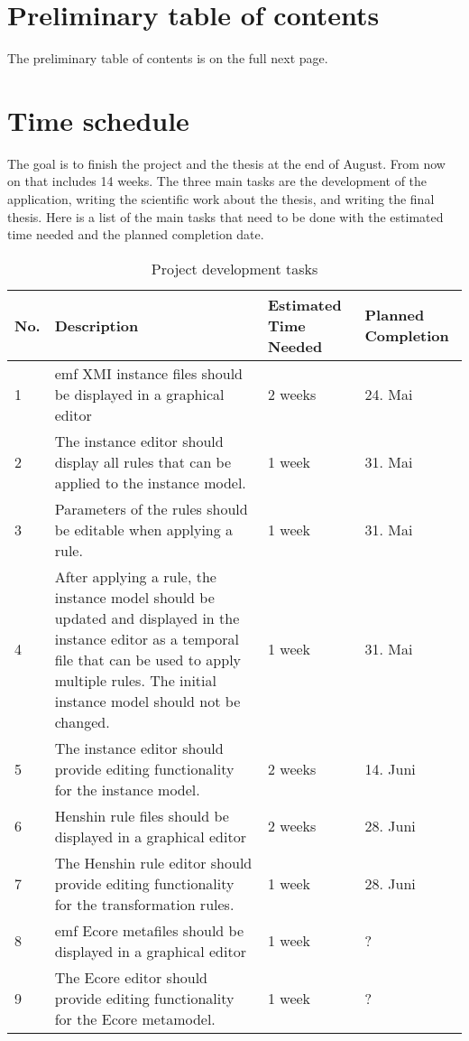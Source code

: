 \documentclass[conference,onecolumn]{IEEEtran}
\begin{document}
  \section{Preliminary table of contents}
  The preliminary table of contents is on the full next page.

  

  \section{Time schedule}
  The goal is to finish the project and the thesis at the end of August. From now on that includes 14 weeks. The three main tasks are the development of the application, writing the scientific work about the thesis, and writing the final thesis. Here is a list of the main tasks that need to be done with the estimated time needed and the planned completion date.

  \begin{table}[h!]
    \centering
    \caption{Project development tasks}
    \begin{tabular}{|p{0.5cm}|p{8cm}|l|l|}
      \hline
      \textbf{No.} & \textbf{Description} & \textbf{Estimated Time Needed} & \textbf{Planned Completion} \\
      \hline
      1 & \ac{emf} XMI instance files should be displayed in a graphical editor & 2 weeks & 24. Mai \\
      2 & The instance editor should display all rules that can be applied to the instance model. & 1 week & 31. Mai \\
      3 & Parameters of the rules should be editable when applying a rule. & 1 week & 31. Mai \\
      4 & After applying a rule, the instance model should be updated and displayed in the instance editor as a temporal file that can be used to apply multiple rules. The initial instance model should not be changed. & 1 week & 31. Mai \\
      5 & The instance editor should provide editing functionality for the instance model. & 2 weeks & 14. Juni \\
      6 & Henshin rule files should be displayed in a graphical editor & 2 weeks & 28. Juni \\
      7 & The Henshin rule editor should provide editing functionality for the transformation rules. & 1 week & 28. Juni \\
      8 & \ac{emf} Ecore metafiles should be displayed in a graphical editor & 1 week & ? \\
      9 & The Ecore editor should provide editing functionality for the Ecore metamodel. & 1 week & ? \\
      

      \hline
    \end{tabular}
  \end{table}
\end{document}
